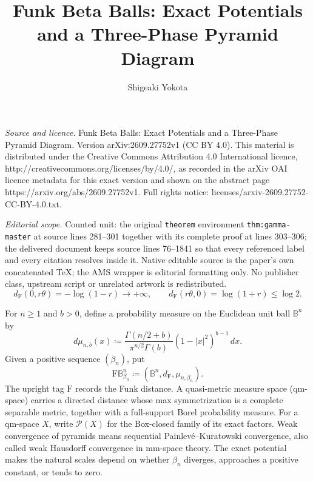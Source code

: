 \documentclass[10pt,a4paper]{amsart}
\numberwithin{equation}{section}
\newcommand{\B}{\mathbb B}
\newcommand{\BetaBall}{\mathrm F\mathbb B^n_{\beta_n}}
\newcommand{\Pyr}{\mathcal P}
\newcommand{\dF}{d_{\mathrm F}}
\begin{document}
\title[Funk Beta Balls: Exact Potentials and a Three-Phase Pyramid ]{Funk Beta Balls: Exact Potentials and a Three-Phase Pyramid Diagram}
\author{Shigeaki Yokota}
\date{}
\maketitle
\noindent\emph{Source and licence.} Funk Beta Balls: Exact Potentials and a Three-Phase Pyramid Diagram. Version arXiv:2609.27752v1 (CC BY 4.0). This material is distributed under the Creative Commons Attribution 4.0 International licence, http://creativecommons.org/licenses/by/4.0/, as recorded in the arXiv OAI licence metadata for this exact version and shown on the abstract page https://arxiv.org/abs/2609.27752v1. Full rights notice: licenses/arxiv-2609.27752-CC-BY-4.0.txt.\par\smallskip
\noindent\textit{Editorial scope.} Counted unit: the original \texttt{theorem} environment \texttt{thm:gamma-master} at source lines 281--301 together with its complete proof at lines 303--306; the delivered document keeps source lines 76--1841 so that every referenced label and every citation resolves inside it. Native editable source is the paper's own concatenated TeX; the AMS wrapper is editorial formatting only. No publisher class, upstream script or unrelated artwork is redistributed.
\begin{equation}\label{eq:origin-distances} \dF(0,r\theta)=-\log(1-r)\longrightarrow+\infty,\qquad \dF(r\theta,0)=\log(1+r)\le\log2. \end{equation}

For $n\ge1$ and $b>0$, define a probability measure on the Euclidean unit ball $\B^n$ by
\begin{equation}\label{eq:beta-measure} d\mu_{n,b}(x) \coloneqq\frac{\Gamma(n/2+b)}{\pi^{n/2}\Gamma(b)}(1-|x|^2)^{b-1}\,dx. \end{equation}
Given a positive sequence $(\beta_n)$, put
\[ \BetaBall\coloneqq(\B^n,\dF,\mu_{n,\beta_n}). \]
The upright tag $\mathrm F$ records the Funk distance.
A quasi-metric measure space (qm-space) carries a directed distance whose max symmetrization is a complete separable metric, together with a full-support Borel probability measure.  For a qm-space $X$, write $\Pyr(X)$ for the Box-closed family of its exact factors.  Weak convergence of pyramids means sequential Painlev\'e--Kuratowski convergence, also called weak Hausdorff convergence in mm-space theory.  The exact potential makes the natural scales depend on whether $\beta_n$ diverges, approaches a positive constant, or tends to zero.
\end{document}
